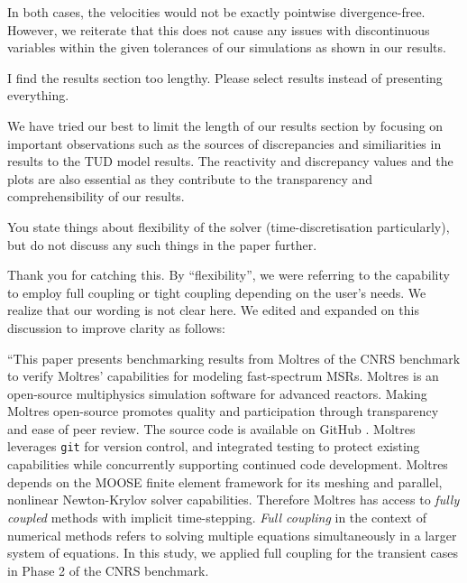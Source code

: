 \documentclass[answers,11pt]{exam}
\begin{document}
\begin{questions}
\begin{solution}
            In both cases, the velocities would not be exactly pointwise
            divergence-free. However, we reiterate that this does not cause
            any issues with discontinuous variables within the given tolerances
            of our simulations as shown in our results.
        \end{solution}
        \question I find the results section too lengthy. Please select results
        instead of presenting everything.
        \begin{solution}
        	We have tried our best to limit the length of our results section
        	by focusing on important observations such as the sources of
        	discrepancies and similiarities in results to the TUD model
        	results. The reactivity and discrepancy values and the plots are
        	also essential as they contribute to the transparency and
        	comprehensibility of our results.
        \end{solution}

        \question You state things about flexibility of the solver
        (time-discretisation particularly), but do not discuss any such things
        in the paper further.
        \begin{solution}
        	Thank you for catching this. By ``flexibility'', we were referring
        	to the capability to employ full coupling or tight coupling
        	depending on the user's needs. We realize that our wording is not
        	clear here. We edited and expanded on this discussion to improve
        	clarity as follows:
        	
        	``This paper presents benchmarking results from Moltres of the CNRS benchmark
to verify Moltres' capabilities for modeling fast-spectrum \glspl{MSR}. Moltres
is an open-source multiphysics simulation software for advanced reactors.
Making Moltres open-source promotes quality and participation through
transparency and ease of peer review. The source code
\cite{lindsay_moltres_2017} is available on GitHub \cite{github_build_2017}.
Moltres leverages \texttt{git} for version control, and integrated testing to
protect existing capabilities while concurrently supporting continued code
development. Moltres depends on the MOOSE finite element framework for
its meshing and parallel, nonlinear Newton-Krylov solver capabilities.
Therefore Moltres has access to \textit{fully coupled} methods with implicit
time-stepping. \textit{Full coupling} in the context of numerical methods
refers to solving multiple equations simultaneously in a larger system of
equations. In this study, we applied full coupling for the transient
cases in Phase 2 of the CNRS benchmark.


\end{solution}
\end{questions}
\end{document}
